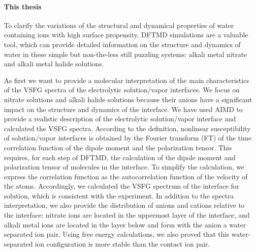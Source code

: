 \paragraph{This thesis}
%
To clarify the variations of the structural and dynamical properties 
of water containing ions with high surface propensity, DFTMD simulations are a valuable tool, 
which can provide detailed information on the structure and dynamics  
of water in these simple but non-the-less still puzzling systems: alkali metal nitrate and alkali metal halide solutions\cite{Mizoguchi1998}.

As first we want to provide a molecular interpretation of the main characteristics of the
VSFG spectra of the electrolytic solution/vapor interfaces.
We focus on nitrate solutions and alkali halide solutions because their anions have a significant impact on the structure and dynamics of the interface.
We have used AIMD to provide a realistic description of the electrolytic solution/vapor interface and calculated the VSFG spectra.
According to the definition, nonlinear susceptibility of solution/vapor interfaces is obtained by the Fourier transform (FT) of 
the time correlation function of the dipole moment and the polarization tensor. This requires, for each step of DFTMD, 
the calculation of the dipole moment and polarization tensor of molecules in the interface. 
To simplify the calculation, we express the correlation function 
as the autocorrelation function of the velocity of the atoms. 
Accordingly, we calculated the VSFG spectrum of the interface for \LiN solution,
which is consistent with the experiment. 
In addition to the spectra interpretation, we also provide the distribution of anions 
and cations relative to the interface: nitrate ions are located in the uppermost layer of the interface, 
and alkali metal ions are located in the layer below and form with the anion a water separated ion pair. 
Using free energy calculations, we also proved that this water-separated ion configuration is more stable than the contact ion pair.

